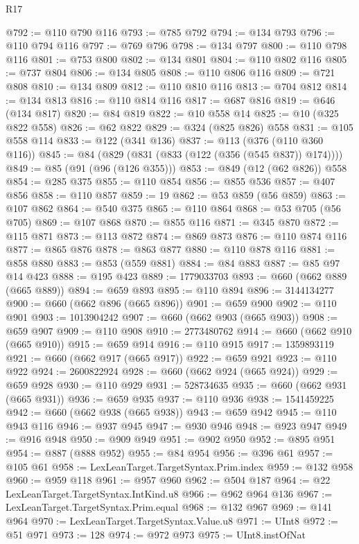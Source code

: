 \begin{lexlean}{R17}
\begin{coremodule}
{{{{{{{{{{{{{{{{{{{{{{{{{{{{{{{{{{{{{{{{{{{{{{{{{{{{{{{{{{{{{{{{{{{{{{{{{{{{{{{{{{{{{@792 := @110 @790 @116
@793 := @785 @792
@794 := @134 @793
@796 := @110 @794 @116
@797 := @769 @796
@798 := @134 @797
@800 := @110 @798 @116
@801 := @753 @800
@802 := @134 @801
@804 := @110 @802 @116
@805 := @737 @804
@806 := @134 @805
@808 := @110 @806 @116
@809 := @721 @808
@810 := @134 @809
@812 := @110 @810 @116
@813 := @704 @812
@814 := @134 @813
@816 := @110 @814 @116
@817 := @687 @816
@819 := @646 (@134 @817)
@820 := @84 @819
@822 := @10 @558 @14
@825 := @10 (@325 @822 @558)
@826 := @62 @822
@829 := @324 (@825 @826) @558
@831 := @105 @558 @114
@833 := @122 (@341 @136)
@837 := @113 (@376 (@110 @360 @116))
@845 := @84 (@829 (@831 (@833 (@122 (@356 (@545 @837)) @174))))
@849 := @85 (@91 (@96 (@126 @355)))
@853 := @849 (@12 (@62 @826)) @558
@854 := @285 @375
@855 := @110 @854
@856 := @855 @536
@857 := @407 @856
@858 := @110 @857
@859 := 19
@862 := @53 @859 (@56 @859)
@863 := @107 @862
@864 := @540 @375
@865 := @110 @864
@868 := @53 @705 (@56 @705)
@869 := @107 @868
@870 := @855 @116
@871 := @345 @870
@872 := @115 @871
@873 := @113 @872
@874 := @869 @873
@876 := @110 @874 @116
@877 := @865 @876
@878 := @863 @877
@880 := @110 @878 @116
@881 := @858 @880
@883 := @853 (@559 @881)
@884 := @84 @883
@887 := @85 @97 @14 @423
@888 := @195 @423
@889 := 1779033703
@893 := @660 (@662 @889 (@665 @889))
@894 := @659 @893
@895 := @110 @894
@896 := 3144134277
@900 := @660 (@662 @896 (@665 @896))
@901 := @659 @900
@902 := @110 @901
@903 := 1013904242
@907 := @660 (@662 @903 (@665 @903))
@908 := @659 @907
@909 := @110 @908
@910 := 2773480762
@914 := @660 (@662 @910 (@665 @910))
@915 := @659 @914
@916 := @110 @915
@917 := 1359893119
@921 := @660 (@662 @917 (@665 @917))
@922 := @659 @921
@923 := @110 @922
@924 := 2600822924
@928 := @660 (@662 @924 (@665 @924))
@929 := @659 @928
@930 := @110 @929
@931 := 528734635
@935 := @660 (@662 @931 (@665 @931))
@936 := @659 @935
@937 := @110 @936
@938 := 1541459225
@942 := @660 (@662 @938 (@665 @938))
@943 := @659 @942
@945 := @110 @943 @116
@946 := @937 @945
@947 := @930 @946
@948 := @923 @947
@949 := @916 @948
@950 := @909 @949
@951 := @902 @950
@952 := @895 @951
@954 := @887 (@888 @952)
@955 := @84 @954
@956 := @396 @61
@957 := @105 @61
@958 := LexLeanTarget.TargetSyntax.Prim.index
@959 := @132 @958
@960 := @959 @118
@961 := @957 @960
@962 := @504 @187
@964 := @22 LexLeanTarget.TargetSyntax.IntKind.u8
@966 := @962 @964 @136
@967 := LexLeanTarget.TargetSyntax.Prim.equal
@968 := @132 @967
@969 := @141 @964
@970 := LexLeanTarget.TargetSyntax.Value.u8
@971 := UInt8
@972 := @51 @971
@973 := 128
@974 := @972 @973
@975 := UInt8.instOfNat
}}}}}}}}}}}}}}}}}}}}}}}}}}}}}}}}}}}}}}}}}}}}}}}}}}}}}}}}}}}}}}}}}}}}}}}}}}}}}}}}}}}}}
\end{coremodule}
\end{lexlean}
